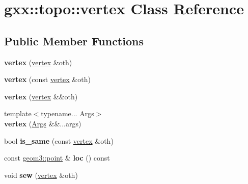 \hypertarget{classgxx_1_1topo_1_1vertex}{}\section{gxx\+:\+:topo\+:\+:vertex Class Reference}
\label{classgxx_1_1topo_1_1vertex}
\subsection*{Public Member Functions}
\begin{DoxyCompactItemize}
\item 
{\bfseries vertex} (\hyperlink{classgxx_1_1topo_1_1vertex}{vertex} \&oth)\hypertarget{classgxx_1_1topo_1_1vertex_aefd29fef6f717059f59f96f69c172f2a}{}\label{classgxx_1_1topo_1_1vertex_aefd29fef6f717059f59f96f69c172f2a}

\item 
{\bfseries vertex} (const \hyperlink{classgxx_1_1topo_1_1vertex}{vertex} \&oth)\hypertarget{classgxx_1_1topo_1_1vertex_a74d93c4a6722663ea577b51be32ae9e6}{}\label{classgxx_1_1topo_1_1vertex_a74d93c4a6722663ea577b51be32ae9e6}

\item 
{\bfseries vertex} (\hyperlink{classgxx_1_1topo_1_1vertex}{vertex} \&\&oth)\hypertarget{classgxx_1_1topo_1_1vertex_a8d7eeaf3f632ac54010f5f58fa676e8f}{}\label{classgxx_1_1topo_1_1vertex_a8d7eeaf3f632ac54010f5f58fa676e8f}

\item 
{\footnotesize template$<$typename... Args$>$ }\\{\bfseries vertex} (\hyperlink{structArgs}{Args} \&\&...args)\hypertarget{classgxx_1_1topo_1_1vertex_a1c20ce0b3ba1ecd8b58de3a59e3ad11a}{}\label{classgxx_1_1topo_1_1vertex_a1c20ce0b3ba1ecd8b58de3a59e3ad11a}

\item 
bool {\bfseries is\+\_\+same} (const \hyperlink{classgxx_1_1topo_1_1vertex}{vertex} \&oth)\hypertarget{classgxx_1_1topo_1_1vertex_a3b51307399ecd9dffeb373143e87c7b4}{}\label{classgxx_1_1topo_1_1vertex_a3b51307399ecd9dffeb373143e87c7b4}

\item 
const \hyperlink{classgxx_1_1geom3_1_1point}{geom3\+::point} \& {\bfseries loc} () const \hypertarget{classgxx_1_1topo_1_1vertex_ab5c93678330c74710213b4f183793df7}{}\label{classgxx_1_1topo_1_1vertex_ab5c93678330c74710213b4f183793df7}

\item 
void {\bfseries sew} (\hyperlink{classgxx_1_1topo_1_1vertex}{vertex} \&oth)\hypertarget{classgxx_1_1topo_1_1vertex_aeccbca27076ad77419d386aebecdf645}{}\label{classgxx_1_1topo_1_1vertex_aeccbca27076ad77419d386aebecdf645}


\end{DoxyCompactItemize}
